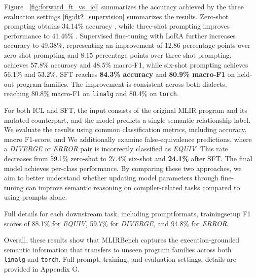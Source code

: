 \documentclass[sigplan,screen,review,anonymous]{acmart}
\providecommand{\DIFadd}[1]{{\protect\color{blue} \sf #1}} %
\providecommand{\DIFdel}[1]{{\protect\color{red} \scriptsize #1}} %
\providecommand{\DIFaddbegin}{} %
\providecommand{\DIFaddend}{} %
\providecommand{\DIFdelbegin}{} %
\providecommand{\DIFdelend}{} %
\begin{document}
Figure~\DIFdelbegin \DIFdel{\ref{fig:forward_ft_vs_icl} summarizes the accuracy achieved by the three evaluation settings}\DIFdelend \DIFaddbegin \DIFadd{\ref{fig:dt2_supervision} summarizes the results}\DIFaddend . Zero-shot prompting
\DIFdelbegin \DIFdel{obtains 34.14\% accuracy , while three-shot prompting
improves performance to 41.46\% . Supervised fine-tuning with LoRA further increases accuracy to 49.38\%, representing an improvement of 12.86 percentage points over zero-shot prompting and
8.15 percentage points over three-shot prompting. }\DIFdelend \DIFaddbegin \DIFadd{achieves 57.8\% accuracy and 48.5\% macro-F1, while six-shot prompting
achieves 56.1\% and 53.2\%. SFT reaches \textbf{84.3\% accuracy} and
\textbf{80.9\% macro-F1} on held-out program families. The improvement is
consistent across both dialects, reaching 80.8\% macro-F1 on \texttt{linalg}
and 80.4\% on \texttt{torch}.
}\DIFaddend 

\DIFdelbegin \DIFdel{For both ICL and SFT, the input consists of the original MLIR program and its mutated counterpart, and the model predicts a
single semantic relationship label. We evaluate the results using common classification metrics, including accuracy, macro F1-score, and
}\DIFdelend \DIFaddbegin \DIFadd{We additionally examine false-equivalence predictions, where a
\textit{DIVERGE} or \textit{ERROR} pair is incorrectly classified as
\textit{EQUIV}. This rate decreases from 59.1\% zero-shot to 27.4\%
six-shot and \textbf{24.1\%} after SFT. The final model achieves }\DIFaddend per-class
\DIFdelbegin \DIFdel{performance.
By comparing these two approaches, we aim to better understand whether updating model parameters through fine-tuning can improve semantic reasoning on compiler-related tasks compared to using prompts alone. }%

\DIFdel{Full details for each downstream task, including promptformats, trainingsetup}\DIFdelend \DIFaddbegin \DIFadd{F1 scores of 88.1\% for \textit{EQUIV}, 59.7\% for \textit{DIVERGE}, and
94.8\% for \textit{ERROR}.
}

\DIFadd{Overall, these results show that MLIRBench captures the execution-grounded semantic information that transfers to unseen program families across both
\texttt{linalg} and \texttt{torch}. Full prompt}\DIFaddend , \DIFaddbegin \DIFadd{training, }\DIFaddend and evaluation
\DIFdelbegin \DIFdel{settings, }\DIFdelend \DIFaddbegin \DIFadd{details }\DIFaddend are provided in Appendix G.
\end{document}
